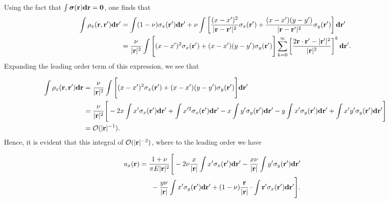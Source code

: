 \documentclass[aps,prl,reprint,twocolumn,groupedaddress,showpacs]{revtex4}
\newcommand{\bsigma}{{\boldsymbol\sigma}}
\def\d{{\bf d}}
\def\r{{\bf r}}
\begin{document}
\begin{widetext}
Using the fact that $\int \bsigma(\r)\d\r = \mathbf{0}$, one finds that
%
\begin{align}
\int \rho_{x}(\r,\r')\d\r'  & =  \int (1-\nu)\sigma_x(\r')\d\r'
+\nu\int\left[\frac{(x - x')^2}{|\r-\r'|^2} \sigma_{x}(\r') +
\frac{(x-x')(y-y')}{|\r-\r'|^2} \sigma_y(\r')  \right]\d\r' \nonumber\\
\: &= \frac{\nu}{|\r|^2}\int\Bigg[(x - x')^2\sigma_{x}(\r')
+ (x-x')(y-y')\sigma_y(\r')  \Bigg]
\sum_{k=0}^\infty \left[\frac{2\r\cdot\r' - |\r'|^2}{|\r|^2} \right]^k \d\r'.
\end{align}
%
Expanding the leading order term of this expression, we see that

\begin{align*}
\int\rho_{x}(\r,\r')\d\r 
&= \frac{\nu}{|\r|^2}\int\Bigg[(x- x')^2\sigma_{x}(\r')+(x-x')(y-y')\sigma_y(\r')\Bigg]
\d\r' \nonumber\\
\: &= \frac{\nu}{|\r|^2}  \Bigg[  -2x\int x'\sigma_x(\r')\d\r'  + \int x'^2\sigma_x(\r')\d\r'- x\int y' \sigma_y(\r') \d\r'- y\int x'\sigma_y(\r')\d\r'
+ \int x'y' \sigma_y(\r') \d\r'\Bigg] \nonumber \\
\: & =\mathcal{O}(|\r|^{-1}).
\end{align*}
%
Hence, it is evident that this integral of $\mathcal{O}(|\r|^{-2})$,
where to the leading order we have

\begin{align}
\lefteqn{u_x(\r) = \frac{1+\nu}{\pi E |\r|^2}
\Bigg[ -2\nu\frac{x}{|\r|}\int x'\sigma_x(\r')\d\r'
-\frac{x\nu}{|\r|}\int y' \sigma_y(\r') \d\r'  }\nonumber\\
&\qquad\qquad- \frac{y\nu}{|\r|}\int x'\sigma_y(\r')\d\r' 
+ (1-\nu)\frac{\r}{|\r|}\cdot\int \r'\sigma_x(\r') \d\r'\Bigg].
\end{align}



\end{widetext}
\end{document}

